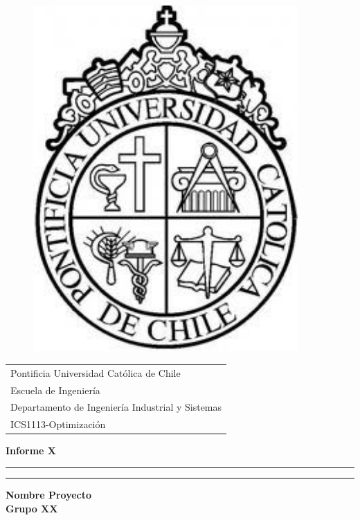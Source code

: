 \documentclass[letterpaper]{article}
\begin{document}
\begin{minipage}[t]{.13\textwidth}
	\vspace{-0.25in}
	\begin{figure}[H]
	\includegraphics[width=0.90\textwidth]{LogoUC.jpg}
	\end{figure}
\end{minipage}
\hfill
\begin{minipage}[t]{.85\textwidth}
    \vspace{0pt}
    \begin{flushleft}
      \begin{tabular}{l}
	{\sc Pontificia Universidad Cat\'olica de Chile}\\
  	{\sc Escuela de Ingenier\'ia}\\
  	{\sc Departamento de Ingenier\'ia Industrial y Sistemas}\\
 	 {\sc ICS1113-Optimizaci\'on}
 \end{tabular}
	\end{flushleft}
\end{minipage}
\vspace{0pt}
\hfill
\vspace*{6cm}
\begin{center}{}
\vspace*{2mm}
{\Huge\bf Informe X}\\
\vspace*{4mm}
\hrule\vspace*{1pt}\hrule
\vspace*{4mm}
{\LARGE\bf Nombre Proyecto}\\
\vspace*{4mm}
{\huge\bf Grupo XX }\\
\vspace*{1mm}
\end{center}
\end{document}
